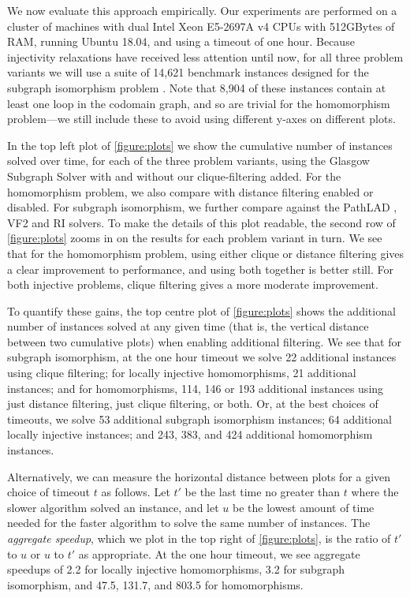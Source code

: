 \documentclass{article}
\begin{document}
We now evaluate this approach empirically. Our experiments are performed on a cluster of machines
with dual Intel Xeon E5-2697A v4 CPUs with 512GBytes of RAM, running Ubuntu 18.04, and using a
timeout of one hour. Because injectivity relaxations have received less attention until now, for all
three problem variants we will use a suite of 14,621 benchmark instances designed for the subgraph
isomorphism problem \cite{DBLP:conf/lion/KotthoffMS16}. Note that 8,904 of these instances contain
at least one loop in the codomain graph, and so are trivial for the homomorphism problem---we still
include these to avoid using different y-axes on different plots.

In the top left plot of \cref{figure:plots} we show the cumulative number of instances solved over
time, for each of the three problem variants, using the Glasgow Subgraph Solver with and without our
clique-filtering added. For the homomorphism problem, we also compare with distance filtering
enabled or disabled. For subgraph isomorphism, we further compare against the PathLAD
\cite{DBLP:conf/lion/KotthoffMS16}, VF2 \cite{DBLP:journals/pami/CordellaFSV04} and RI
\cite{DBLP:journals/bmcbi/BonniciGPSF13} solvers. To make the details of this plot readable, the
second row of \cref{figure:plots} zooms in on the results for each
problem variant in turn. We see that for the homomorphism problem, using either clique or
distance filtering gives a clear improvement to performance, and using both together is better
still. For both injective problems, clique filtering gives a more moderate improvement.

To quantify these gains, the top centre plot of \cref{figure:plots} shows the
additional number of instances solved at any given time (that is, the vertical distance between
two cumulative plots) when enabling additional filtering. We see that for subgraph isomorphism, at
the one hour timeout we solve 22 additional instances using clique filtering; for locally injective
homomorphisms, 21 additional instances; and for homomorphisms, 114, 146 or 193 additional instances
using just distance filtering, just clique filtering, or both. Or, at the best choices of timeouts,
we solve 53 additional subgraph isomorphism instances; 64 additional locally injective instances;
and 243, 383, and 424 additional homomorphism instances.

Alternatively, we can measure the horizontal distance between plots for a given choice of timeout
$t$ as follows. Let $t'$ be the last time no greater than $t$ where the slower algorithm solved an
instance, and let $u$ be the lowest amount of time needed for the faster algorithm to solve the same
number of instances.  The \emph{aggregate speedup}, which we plot in the top right of
\cref{figure:plots}, is the ratio of $t'$ to $u$ or $u$ to $t'$ as appropriate. At the one hour
timeout, we see aggregate speedups of 2.2 for locally injective homomorphisms, 3.2 for subgraph
isomorphism, and 47.5, 131.7, and 803.5 for homomorphisms.
\end{document}
